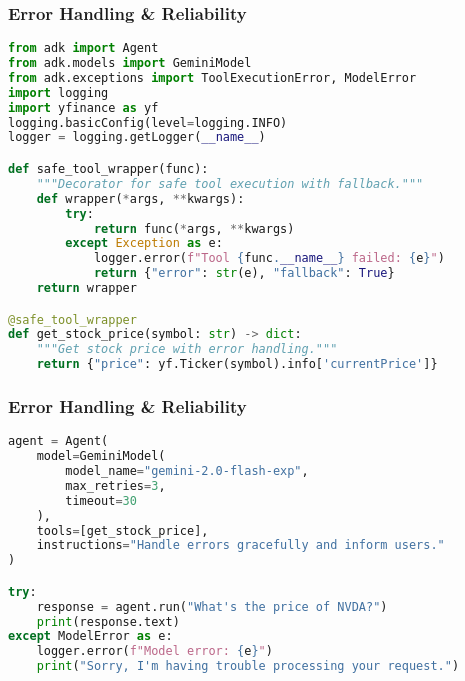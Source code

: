 \begin{frame}[fragile]\frametitle{Error Handling \& Reliability}
      
      \begin{lstlisting}[language=python, basicstyle=\tiny]
from adk import Agent
from adk.models import GeminiModel
from adk.exceptions import ToolExecutionError, ModelError
import logging
import yfinance as yf
logging.basicConfig(level=logging.INFO)
logger = logging.getLogger(__name__)

def safe_tool_wrapper(func):
    """Decorator for safe tool execution with fallback."""
    def wrapper(*args, **kwargs):
        try:
            return func(*args, **kwargs)
        except Exception as e:
            logger.error(f"Tool {func.__name__} failed: {e}")
            return {"error": str(e), "fallback": True}
    return wrapper

@safe_tool_wrapper
def get_stock_price(symbol: str) -> dict:
    """Get stock price with error handling."""
    return {"price": yf.Ticker(symbol).info['currentPrice']}

      \end{lstlisting}
\end{frame}


\begin{frame}[fragile]\frametitle{Error Handling \& Reliability}

      
      \begin{lstlisting}[language=python, basicstyle=\tiny]
agent = Agent(
    model=GeminiModel(
        model_name="gemini-2.0-flash-exp",
        max_retries=3,
        timeout=30
    ),
    tools=[get_stock_price],
    instructions="Handle errors gracefully and inform users."
)

try:
    response = agent.run("What's the price of NVDA?")
    print(response.text)
except ModelError as e:
    logger.error(f"Model error: {e}")
    print("Sorry, I'm having trouble processing your request.")
      \end{lstlisting}
\end{frame}

